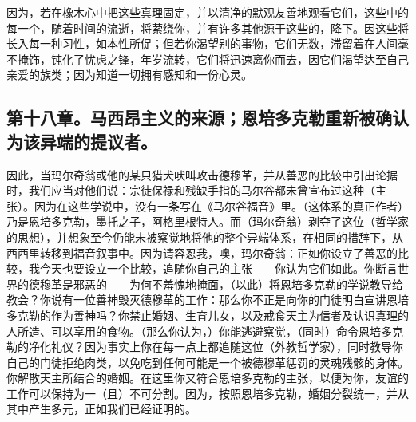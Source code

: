 因为，若在橡木心中把这些真理固定，\newline{}并以清净的默观友善地观看它们，\newline{}这些中的每一个，随着时间的流逝，将萦绕你，\newline{}并有许多其他源于这些的，降下。\newline{}因这些将长入每一种习性，如本性所促；\newline{}但若你渴望别的事物，它们无数，滞留着\newline{}在人间毫不掩饰，钝化了忧虑之锋，\newline{}年岁流转，它们将迅速离你而去，\newline{}因它们渴望达至自己亲爱的族类；\newline{}因为知道一切拥有感知和一份心灵。\newline{}\par


\subsection{第十八章。马西昂主义的来源；恩培多克勒重新被确认为该异端的提议者。}

因此，当玛尔奇翁或他的某只猎犬吠叫攻击德穆革，并从善恶的比较中引出论据时，我们应当对他们说：宗徒保禄和残缺手指的马尔谷都未曾宣布过这种（主张）。因为在这些学说中，没有一条写在《马尔谷福音》里。（这体系的真正作者）乃是恩培多克勒，墨托之子，阿格里根特人。而（玛尔奇翁）剥夺了这位（哲学家的思想），并想象至今仍能未被察觉地将他的整个异端体系，在相同的措辞下，从西西里转移到福音叙事中。因为请容忍我，噢，玛尔奇翁：正如你设立了善恶的比较，我今天也要设立一个比较，追随你自己的主张——你认为它们如此。你断言世界的德穆革是邪恶的——为何不羞愧地掩面，（以此）将恩培多克勒的学说教导给教会？你说有一位善神毁灭德穆革的工作：那么你不正是向你的门徒明白宣讲恩培多克勒的作为善神吗？你禁止婚姻、生育儿女，以及戒食天主为信者及认识真理的人所造、可以享用的食物。（那么你认为，）你能逃避察觉，（同时）命令恩培多克勒的净化礼仪？因为事实上你在每一点上都追随这位（外教哲学家），同时教导你自己的门徒拒绝肉类，以免吃到任何可能是一个被德穆革惩罚的灵魂残骸的身体。你解散天主所结合的婚姻。在这里你又符合恩培多克勒的主张，以便为你，友谊的工作可以保持为一（且）不可分割。因为，按照恩培多克勒，婚姻分裂统一，并从其中产生多元，正如我们已经证明的。\par


